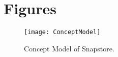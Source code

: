 \chapter{Figures}

\vspace*{-3in}

\begin{figure}
\vspace{2.4in}
\texttt{[image: ConceptModel]}
\caption{Concept Model of Snapstore.}
\label{arm:fig1}
\end{figure}
\clearpage
\newpage

